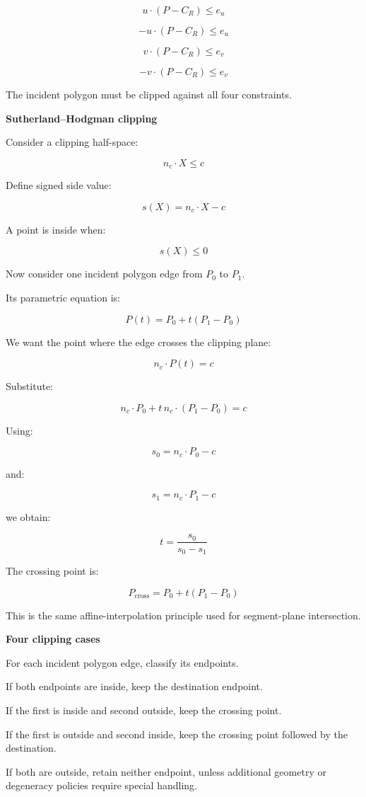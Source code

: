 \[
\boxed{ u\cdot(P-C_R)\le e_u }
\]

\[
\boxed{ -u\cdot(P-C_R)\le e_u }
\]

\[
\boxed{ v\cdot(P-C_R)\le e_v }
\]

\[
\boxed{ -v\cdot(P-C_R)\le e_v }
\]

The incident polygon must be clipped against all four constraints.

\textbf{Sutherland--Hodgman clipping}

Consider a clipping half-space:

\[
\boxed{ n_c\cdot X\le c }
\]

Define signed side value:

\[
s(X)=n_c\cdot X-c
\]

A point is inside when:

\[
s(X)\le0
\]

Now consider one incident polygon edge from \(P_0\) to \(P_1\).

Its parametric equation is:

\[
P(t)=P_0+t(P_1-P_0)
\]

We want the point where the edge crosses the clipping plane:

\[
n_c\cdot P(t)=c
\]

Substitute:

\[
n_c\cdot P_0+t\,n_c\cdot(P_1-P_0)=c
\]

Using:

\[
s_0=n_c\cdot P_0-c
\]

and:

\[
s_1=n_c\cdot P_1-c
\]

we obtain:

\[
\boxed{ t=\frac{s_0}{s_0-s_1} }
\]

The crossing point is:

\[
\boxed{ P_{\mathrm{cross}}= P_0+t(P_1-P_0) }
\]

This is the same affine-interpolation principle used for segment-plane intersection.

\textbf{Four clipping cases}

For each incident polygon edge, classify its endpoints.

If both endpoints are inside, keep the destination endpoint.

If the first is inside and second outside, keep the crossing point.

If the first is outside and second inside, keep the crossing point followed by the destination.

If both are outside, retain neither endpoint, unless additional geometry or degeneracy policies require special handling.


